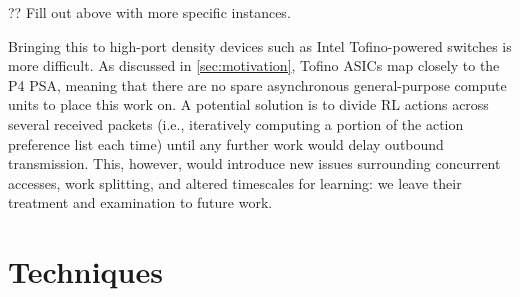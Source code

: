 \documentclass[sigconf,natbib=false]{acmart}
\begin{document}
?? Fill out above with more specific instances.

Bringing this to high-port density devices such as Intel Tofino-powered switches is more difficult.
As discussed in \cref{sec:motivation}, Tofino ASICs map closely to the P4 PSA, meaning that there are no spare asynchronous general-purpose compute units to place this work on.
A potential solution is to divide RL actions across several received packets (i.e., iteratively computing a portion of the action preference list each time) until any further work would delay outbound transmission.
This, however, would introduce new issues surrounding concurrent accesses, work splitting, and altered timescales for learning: we leave their treatment and examination to future work.

\section{Techniques}
\end{document}
